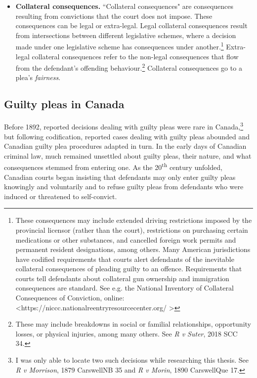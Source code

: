 \begin{itemize}
\item \textbf{Collateral consequences.} ``Collateral consequences" are consequences resulting from convictions that the court does not impose. These consequences can be legal or extra-legal. Legal collateral consequences result from intersections between different legislative schemes, where a decision made under one legislative scheme has consequences under another.\footnote{These consequences may include extended driving restrictions imposed by the provincial licensor (rather than the court), restrictions on purchasing certain medications or other substances, and cancelled foreign work permits and permanent resident designations, among others. Many American jurisdictions have codified requirements that courts alert defendants of the inevitable collateral consequences of pleading guilty to an offence. Requirements that courts tell defendants about collateral gun ownership and immigration consequences are standard. See e.g. the National Inventory of Collateral Consequences of Conviction, online: \textless https://niccc.nationalreentryresourcecenter.org/ \textgreater} Extra-legal collateral consequences refer to the non-legal consequences that flow from the defendant's offending behaviour.\footnote{These may include breakdowns in social or familial relationships, opportunity losses, or physical injuries, among many others. See \textit{R v Suter}, 2018 SCC 34.} Collateral consequences go to a plea's \textit{fairness}.
\end{itemize}

\subsection{Guilty pleas in Canada}

Before 1892, reported decisions dealing with guilty pleas were rare in Canada,\footnote{I was only able to locate two such decisions while researching this thesis. See \textit{R v Morrison}, 1879 CarswellNB 35 and \textit{R v Morin}, 1890 CarswellQue 17.} but following codification, reported cases dealing with guilty pleas abounded and Canadian guilty plea procedures adapted in turn. In the early days of Canadian criminal law, much remained unsettled about guilty pleas, their nature, and what consequences stemmed from entering one. As the 20\textsuperscript{th} century unfolded, Canadian courts began insisting that defendants may only enter guilty pleas knowingly and voluntarily and to refuse guilty pleas from defendants who were induced or threatened to self-convict.

